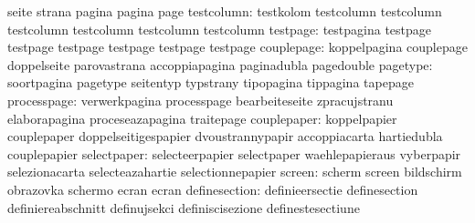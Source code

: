                                   seite                            strana
                                  pagina                           pagina
                                  page
                      testcolumn: testkolom                        testcolumn
                                  testcolumn                       testcolumn
                                  testcolumn                       testcolumn
                                  testcolumn
                        testpage: testpagina                       testpage
                                  testpage                         testpage
                                  testpage                         testpage
                                  testpage
                     couplepage:  koppelpagina                     couplepage
                                  doppelseite                      parovastrana
                                  accoppiapagina                   paginadubla
                                  pagedouble
                        pagetype: soortpagina                      pagetype
                                  seitentyp                        typstrany
                                  tipopagina                       tippagina
                                  tapepage
                     processpage: verwerkpagina                    processpage
                                  bearbeiteseite                   zpracujstranu
                                  elaborapagina                    proceseazapagina
                                  traitepage
                     couplepaper: koppelpapier                     couplepaper
                                  doppelseitigespapier             dvoustrannypapir
                                  accoppiacarta                    hartiedubla
                                  couplepapier
                     selectpaper: selecteerpapier                  selectpaper
                                  waehlepapieraus                  vyberpapir
                                  selezionacarta                   selecteazahartie
                                  selectionnepapier
                          screen: scherm                           screen
                                  bildschirm                       obrazovka
                                  schermo                          ecran
                                  ecran
                   definesection: definieersectie                  definesection
                                  definiereabschnitt               definujsekci
                                  definiscisezione                 definestesectiune
